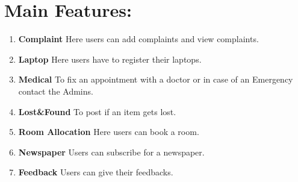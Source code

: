 \documentclass[a4paper,11pt]{article}
\begin{document}
\newpage
\part{\Large Main Features:}
\begin{enumerate}
	\item {\bfseries Complaint} Here users can add complaints and view complaints.
	\item {\bfseries Laptop} Here users have to register their laptops.
	\item {\bfseries Medical} To fix an appointment with a doctor or in case of an Emergency contact the Admins.
	\item {\bfseries Lost\&Found} To post if an item gets lost.
	\item {\bfseries Room Allocation} Here users can book a room.
	\item {\bfseries Newspaper} Users can subscribe for a newspaper.
	\item {\bfseries Feedback} Users can give their feedbacks.
\end{enumerate}
\end{document}
